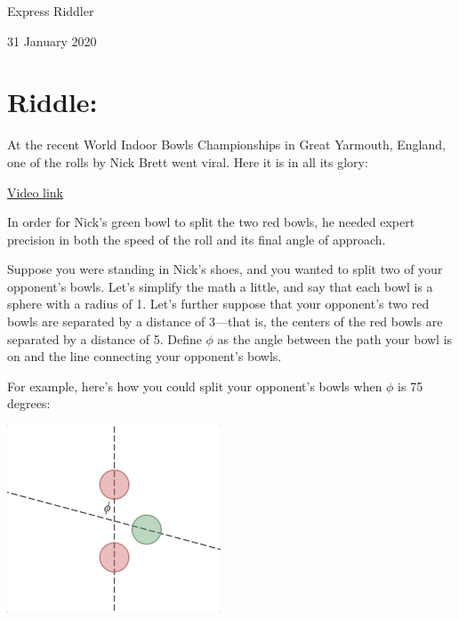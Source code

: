 \documentclass{article}
\begin{document}
\pagestyle{empty} %

\begin{center}
{\LARGE Express Riddler}

\vspace{0.15in}

{\Large 31 January 2020}
\end{center}


\section*{Riddle:}

At the recent World Indoor Bowls Championships in Great Yarmouth, England, one of the rolls by Nick Brett went viral.
Here it is in all its glory:

\href{https://twitter.com/SportsCenter/status/1220355057503363072}{Video link}

In order for Nick’s green bowl to split the two red bowls, he needed expert precision in both the speed of the roll and its final angle of approach.

Suppose you were standing in Nick's shoes, and you wanted to split two of your opponent's bowls.
Let's simplify the math a little, and say that each bowl is a sphere with a radius of 1.
Let's further suppose that your opponent's two red bowls are separated by a distance of 3—that is, the centers of the red bowls are separated by a distance of 5.
Define $\phi$ as the angle between the path your bowl is on and the line connecting your opponent's bowls.

For example, here's how you could split your opponent's bowls when $\phi$ is 75 degrees:

\vspace{0.15in}
\begin{center}
\includegraphics[width=2.5in]{bowls_diagram1.png}
\end{center}
\vspace{0.15in}
\end{document}
